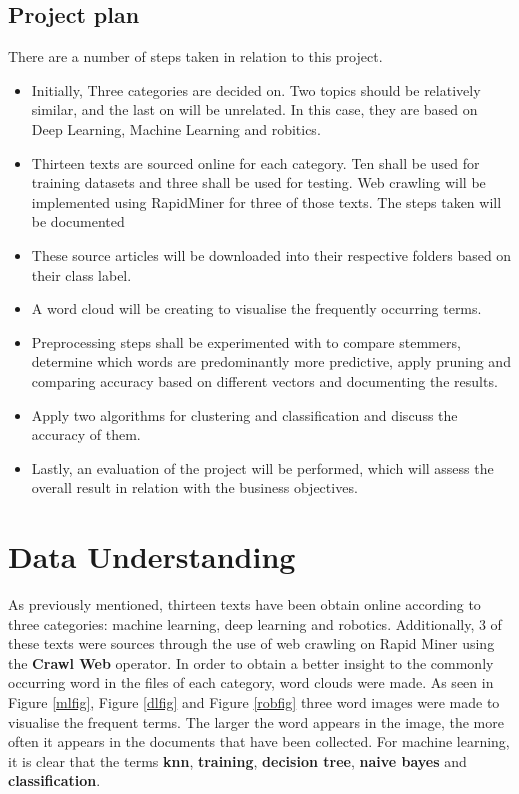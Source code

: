 \subsection*{Project plan}
There are a number of steps taken in relation to this project.
\begin{itemize}
	\item Initially, Three categories are decided on. Two topics should be relatively similar, and the last on will be unrelated. In this case, they are based on Deep Learning, Machine Learning and robitics.
	\item Thirteen texts are sourced online for each category. Ten shall be used for training datasets and three shall be used for testing. Web crawling will be implemented using RapidMiner for three of those texts. The steps taken will be documented 
	\item These source articles will be downloaded into their respective folders based on their class label.
	\item A word cloud will be creating to visualise the frequently occurring terms.
	\item Preprocessing steps shall be experimented with to compare stemmers, determine which words are predominantly more predictive, apply pruning and comparing accuracy based on different vectors and documenting the results.
	\item Apply two algorithms for clustering and classification and discuss the accuracy of them.
	\item Lastly, an evaluation of the project will be performed, which will assess the overall result in relation with the business objectives. 
\end{itemize}


\section*{Data Understanding}

As previously mentioned, thirteen texts have been obtain online according to three categories: machine learning, deep learning and robotics. Additionally, 3 of these texts were sources through the use of web crawling on Rapid Miner using the \textbf{Crawl Web} operator.
In order to obtain a better insight to the commonly occurring word in the files of each category, word clouds were made. As seen in Figure \ref{mlfig}, Figure \ref{dlfig} and Figure \ref{robfig} three word images were made to visualise the frequent terms. The larger the word appears in the image, the more often it appears in the documents that have been collected.
For machine learning, it is clear that the terms \textbf{knn}, \textbf{training}, \textbf{decision tree}, \textbf{naive bayes} and \textbf{classification}.

